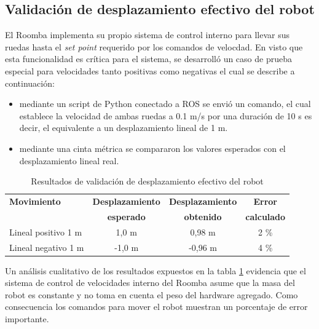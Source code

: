 \subsection{Validación de desplazamiento efectivo del robot}

El Roomba implementa su propio sistema de control interno para llevar sus ruedas hasta el \textit{set point} requerido por los comandos de velocdad. En visto que esta funcionalidad es crítica para el sistema, se desarrolló un caso de prueba especial para velocidades tanto positivas como negativas el cual se describe a continuación:

\begin{itemize}
    \item mediante un script de Python conectado a ROS se envió un comando, el cual establece la velocidad de ambas ruedas a 0.1 m/s por una duración de 10 s es decir, el equivalente a un desplazamiento lineal de 1 m.
    \item mediante una cinta métrica se compararon los valores esperados con el desplazamiento lineal real.
\end{itemize}

\begin{table}
    \centering
    \caption[Desplazamiento robot]{Resultados de validación de desplazamiento efectivo del robot}
    \begin{tabular}{lccc}
        \toprule
        \textbf{Movimiento} & \textbf{Desplazamiento} & \textbf{Desplazamiento} & \textbf{Error}     \\
                            & \textbf{esperado}       & \textbf{obtenido}       & \textbf{calculado} \\
        \midrule
        Lineal positivo 1 m & 1,0 m                   & 0,98 m                  & 2 \%               \\
        Lineal negativo 1 m & -1,0 m                  & -0,96 m                 & 4 \%               \\
        \bottomrule
        \hline
    \end{tabular}
    \label{tab:desplazamientoRobot}
\end{table}

Un análisis cualitativo de los resultados expuestos en la tabla \ref{tab:desplazamientoRobot} evidencia que el sistema de control de velocidades interno del Roomba asume que la masa del robot es constante y no toma en cuenta el peso del hardware agregado. Como consecuencia los comandos para mover el robot muestran un porcentaje de error importante.

